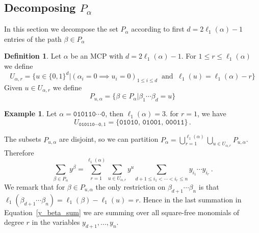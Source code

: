 \documentclass[12pt,reqno]{amsart}
\theoremstyle{plain}
\theoremstyle{definition}
\newtheorem{example}[theorem]{Example}
\newtheorem{definition}[theorem]{Definition}
\begin{document}
\subsection{Decomposing $P_\alpha$} \label{path_partition}
In this section we decompose the set $P_\alpha$ according to first $d=2\ell_1(\alpha)-1$ entries of the path $\beta\in P_\alpha$
\begin{definition} \label{u_alphar}
	Let $\alpha$ be an MCP with $d = 2\ell_1(\alpha)-1$. For $1 \leq r \leq \ell_1(\alpha)$ we define
		\begin{equation}
		U_{\alpha, r} = \big \{ u\in \{0,1\}^d \big | ( \alpha_i = 0 \implies u_i = 0)_{1 \leq i \leq d}\  \text{ and }\   \ell_1(u) = \ell_1(\alpha) -r  \big \} 
		 \label{u_alpha_eqn}
	\end{equation}
	Given $u \in U_{\alpha,r}$ we define
	\begin{equation}
		P_{u, \alpha} = \big\{ \beta\in P_\alpha \big|  \beta_{1} \cdots \beta_d=u  \big\} 
		\label{p_u_alpha_eqn}
	\end{equation}
\end{definition}
\begin{example} \label{u_alpha_example}
	Let $\alpha = \texttt{010110} \cdots \texttt{0}$, then $\ell_1(\alpha)=3$. for $r =1$, we have
		\begin{equation*} 
		U_{\texttt{010110} \cdots \texttt{0},1} = \{\texttt{01010, 01001, 00011}\}\,.
	\end{equation*}
\end{example} 
The subsets $P_{u, \alpha}$ are disjoint, so we can partition $P_\alpha = \bigcup_{r = 1}^{\ell_1(\alpha)} \bigcup_{u \in U_{\alpha,r}} P_{u,\alpha}$. Therefore 
\begin{equation} \label{y_beta_sum}
	\sum_{\beta \in P_\alpha} y^ \beta   = \sum_{r=1}^{\ell_1(\alpha)} \sum_{u \in U_{\alpha,r}} y^u
										\sum_{d+1 \leq i_1 < \cdots < i_r \leq n} y_{i_1} \cdots y_{i_{r}}   \,.
\end{equation} 
We remark that for $\beta\in P_{u, \alpha}$ the only restriction on $\beta_{d+1}\cdots\beta_n$ is that $\ell_1(\beta_{d+1}\cdots\beta_n)=\ell_1(\beta)-\ell_1(u)=r$.
Hence in the last  summation in Equation~\eqref{y_beta_sum}  we are summing over all square-free monomials of degree $r$ in the variables $y_{d+1},...,y_n$.
\end{document}
